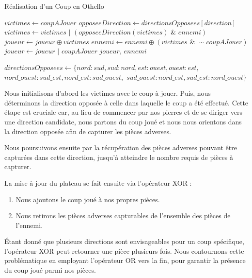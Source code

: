 \begin{algorithm}
    \caption{Réalisation d'un Coup en Othello}
    \begin{algorithmic}[1]
            \State $victimes \gets coupAJouer$
            \State $opposeeDirection \gets directionsOpposees[direction]$
                \State $victimes \gets victimes \,\, | \,\,(opposeeDirection(victimes) \,\, \& \,\, ennemi)$
            \EndFor
            \State $joueur \gets joueur \oplus victimes$
            \State $ennemi \gets ennemi \oplus (victimes \,\, \& \,\, \sim coupAJouer)$
        \EndFor
        \State $joueur \gets joueur \,\, | \,\, coupAJouer$
        \State \Return $joueur$, $ennemi$
    \EndFunction

    \State
    \State $directionsOpposees \gets \{nord: sud, sud: nord, est: ouest, ouest: est,$
    \Statex \hspace{\algorithmicindent} $nord\_ouest: sud\_est, nord\_est: sud\_ouest,$
    \Statex \hspace{\algorithmicindent} $sud\_ouest: nord\_est, sud\_est: nord\_ouest\}$
    \end{algorithmic}
    \label{alg:play_move}
\end{algorithm}
Nous initialisons d'abord les victimes avec le coup à jouer. Puis, nous déterminons la direction opposée à celle dans laquelle le coup a été effectué. Cette étape est cruciale car, au lieu de commencer par nos pierres et de se diriger vers une direction candidate, nous partons du coup joué et nous nous orientons dans la direction opposée afin de capturer les pièces adverses.

Nous poursuivons ensuite par la récupération des pièces adverses pouvant être capturées dans cette direction, jusqu'à atteindre le nombre requis de pièces à capturer.

La mise à jour du plateau se fait ensuite via l'opérateur XOR :
\begin{enumerate}
    \item Nous ajoutons le coup joué à nos propres pièces.
    \item Nous retirons les pièces adverses capturables de l'ensemble des pièces de l'ennemi.
\end{enumerate}

Étant donné que plusieurs directions sont envisageables pour un coup spécifique, l'opérateur XOR peut retourner une pièce plusieurs fois. Nous contournons cette problématique en employant l'opérateur OR vers la fin, pour garantir la présence du coup joué parmi nos pièces.


